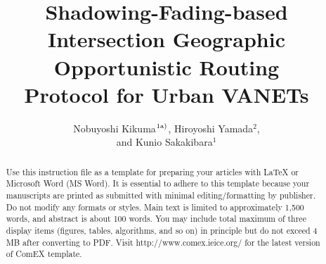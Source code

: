 \documentclass{comex}
\title{Shadowing-Fading-based \\ Intersection  Geographic \\ Opportunistic Routing \\ Protocol   for Urban VANETs}
\author{Nobuyoshi Kikuma$^{\rm 1a)}$, Hiroyoshi Yamada$^{2}$,\\ and Kunio Sakakibara$^{1}$}
\begin{document}
\maketitle

\begin{abstract}                                                                                                                                                                                                                                                                                                                                                                                                                                                                                                                                                                                                                                                                                                                                                                                                                                                                                                                                                                                                                                                                                                                                                                                                                                                                                                                                                                                                                                                                                                                                                                                                                                                                                                                                                                                                                                                                                                                                                                                                                                                      
Use this instruction file as a template for preparing your articles with
\LaTeX{} or Microsoft Word (MS Word). It is essential to adhere to this
template because your manuscripts are printed as submitted with minimal
editing/formatting by publisher. Do not modify any formats or
styles. Main text is limited to approximately 1,500 words, and abstract is about 100
words. You may include total maximum of three display items (figures, tables, algorithms, 
and so on) in principle but do not exceed 4 MB after converting to PDF.
Visit http://www.comex.ieice.org/ for the latest version of ComEX template.
\end{abstract}
\end{document}

